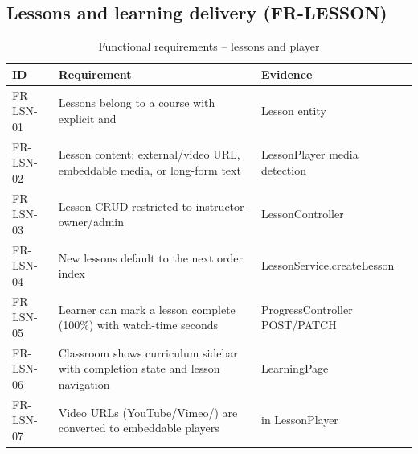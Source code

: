 \subsection{Lessons and learning delivery (FR-LESSON)}
\begin{table}[H]
\centering
\caption{Functional requirements -- lessons and player}
\label{tab:fr-lesson}
\begin{tabular}{@{}C{1.5cm}L{8.6cm}L{3.9cm}@{}}
\toprule
\textbf{ID} & \textbf{Requirement} & \textbf{Evidence} \\
\midrule
FR-LSN-01 & Lessons belong to a course with explicit  and  & Lesson entity \\
FR-LSN-02 & Lesson content: external/video URL, embeddable media, or long-form text & LessonPlayer media detection \\
FR-LSN-03 & Lesson CRUD restricted to instructor-owner/admin & LessonController  \\
FR-LSN-04 & New lessons default to the next order index & LessonService.createLesson \\
FR-LSN-05 & Learner can mark a lesson complete (100\%) with watch-time seconds & ProgressController POST/PATCH \\
FR-LSN-06 & Classroom shows curriculum sidebar with completion state and lesson navigation & LearningPage \\
FR-LSN-07 & Video URLs (YouTube/Vimeo/) are converted to embeddable players &  in LessonPlayer \\
\bottomrule
\end{tabular}
\end{table}


